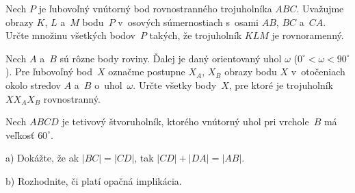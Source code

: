 {Nech $P$ je ľubovoľný vnútorný bod rovnostranného trojuholníka $ABC$.
Uvažujme obrazy $K$, $L$ a~$M$ bodu~$P$ v~osových súmernostiach s~osami
$AB$, $BC$ a~$CA$. Určte
množinu všetkých bodov~$P$ takých, že trojuholník $KLM$ je rovnoramenný.
\vpravo{[53--C--I--4]}

Nech $A$ a~$B$ sú rôzne body roviny. Ďalej je daný orientovaný
uhol $\omega$ ($0^\circ<\omega<90^\circ$). Pre ľubovoľný bod~$X$
označme postupne $X_A$, $X_B$ obrazy bodu $X$ v~otočeniach okolo
stredov $A$ a~$B$ o~uhol~$\omega$. Určte všetky body~$X$, pre
ktoré je trojuholník $XX_AX_B$ rovnostranný.
\vpravo{[48--B--II--4]}

\D
Nech $ABCD$ je tetivový štvoruholník, ktorého vnútorný uhol pri vrchole~$B$ má
veľkosť $60^\circ$.
\item{a)} Dokážte, že ak $|BC|= |CD|$, tak $|CD|+|DA|=|AB|$.
\item{b)} Rozhodnite, či platí opačná implikácia.
\endgraf
\vpravo{[53--A--I--5]}
}

